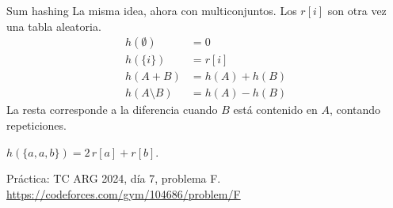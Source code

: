 \begin{frame}{Sum hashing}
  La misma idea, ahora con multiconjuntos.
  Los \(r[i]\) son otra vez una tabla aleatoria.
  \[
    \begin{aligned}
      h(\emptyset) &= 0 \\
      h(\{i\}) &= r[i] \\
      h(A + B) &= h(A) + h(B) \\
      h(A \setminus B) &= h(A) - h(B)
    \end{aligned}
  \]
  La resta corresponde a la diferencia cuando \(B\) está contenido en \(A\), contando repeticiones.

  \medskip
  \(h(\{a,a,b\}) = 2\,r[a] + r[b]\).

  \vspace{0.6em}
  {\footnotesize
  Práctica: TC ARG 2024, día 7, problema F.\\
  \url{https://codeforces.com/gym/104686/problem/F}}
\end{frame}
